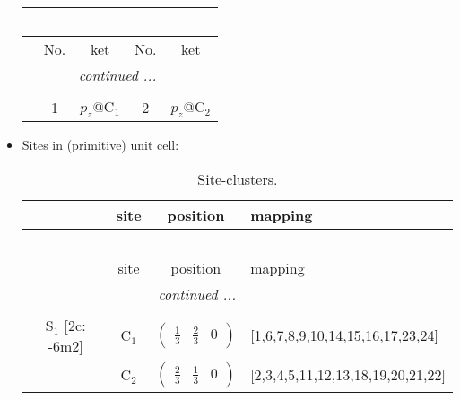 \documentclass[fleqn,10pt,landscape]{article}
\begin{document}
\begin{itemize}
\begin{center}
\begin{longtable}{c|cc|cc}
\multicolumn{4}{l}{\tablename\ \thetable{}} \\
 \hline \hline
 & No. & ket & No. & ket \\ \hline \endhead

 \hline \hline
\multicolumn{4}{r}{\footnotesize\it continued ...} \\ \endfoot

 \hline \hline
\multicolumn{4}{r}{} \\ \endlastfoot

 & 1 & $p_{z}$@C$_{1}$ & 2 & $p_{z}$@C$_{2}$ \\
\end{longtable}
\end{center}

\item Sites in (primitive) unit cell:
\begin{center}
\renewcommand{\arraystretch}{1.3}
\begin{longtable}{cc|c|l}
\caption{Site-clusters.}
 \\
 \hline \hline
 & site & position & mapping \\ \hline \endfirsthead

\multicolumn{3}{l}{\tablename\ \thetable{}} \\
 \hline \hline
 & site & position & mapping \\ \hline \endhead

 \hline \hline
\multicolumn{3}{r}{\footnotesize\it continued ...} \\ \endfoot

 \hline \hline
\multicolumn{3}{r}{} \\ \endlastfoot

S$_{1}$ [2c: -6m2] & C$_1$ & $\begin{pmatrix} \frac{1}{3} & \frac{2}{3} & 0 \end{pmatrix}$ & [1,6,7,8,9,10,14,15,16,17,23,24] \\
& C$_2$ & $\begin{pmatrix} \frac{2}{3} & \frac{1}{3} & 0 \end{pmatrix}$ & [2,3,4,5,11,12,13,18,19,20,21,22] \\
\end{longtable}
\end{center}


\end{itemize}
\end{document}
